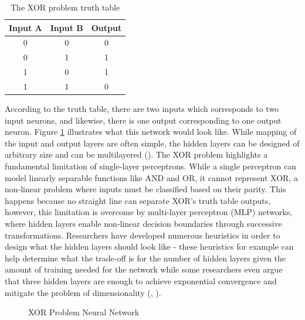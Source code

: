 \begin{table}[H]
    \caption{The XOR problem truth table}
    \label{tab:xor_truth_table}
    \centering
    \begin{tabular}{|c|c|c|}
    \hline
    \textbf{Input A} & \textbf{Input B} & {\color[HTML]{BB5251} \textbf{Output}} \\ \hline
    0                & 0                & {\color[HTML]{BB5251} 0}               \\ \hline
    0                & 1                & {\color[HTML]{BB5251} 1}               \\ \hline
    1                & 0                & {\color[HTML]{BB5251} 1}               \\ \hline
    1                & 1                & {\color[HTML]{BB5251} 0}               \\ \hline
    \end{tabular}
\end{table}

\noindent According to the truth table, there are two inputs which corresponds to two input neurons, and likewise, there is one output corresponding to one output neuron. Figure \ref{fig:ne_xor_network} illustrates what this network would look like. While mapping of the input and output layers are often simple, the hidden layers can be designed of arbitrary size and can be multilayered (\cite{nielsen2015neural}). The XOR problem highlights a fundamental limitation of single-layer perceptrons. While a single perceptron can model linearly separable functions like AND and OR, it cannot represent XOR, a non-linear problem where inputs must be classified based on their parity. This happens because no straight line can separate XOR's truth table outputs, however, this limitation is overcome by multi-layer perceptron (MLP) networks, where hidden layers enable non-linear decision boundaries through successive transformations. Researchers have developed numerous heuristics in order to design what the hidden layers should look like - these heuristics for example can help determine what the trade-off is for the number of hidden layers given the amount of training needed for the network while some researchers even argue that three hidden layers are enough to achieve exponential convergence and mitigate the problem of dimensionality (\cite{nielsen2015neural}, \cite{shen2021neural}).


\begin{figure}[H] %
    \centering %
    \caption{XOR Problem Neural Network}
    \label{fig:ne_xor_network} %
\end{figure}

